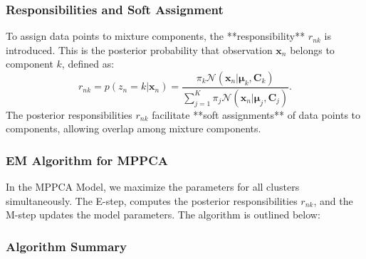 \documentclass{article}
\begin{document}
\subsubsection{Responsibilities and Soft Assignment}
To assign data points to mixture components, the **responsibility** \(r_{nk}\) is introduced. This is the posterior probability that observation \(\mathbf{x}_n\) belongs to component \(k\), defined as:
\[
r_{nk} = p(z_n = k | \mathbf{x}_n) = \frac{\pi_k \mathcal{N}(\mathbf{x}_n | \boldsymbol{\mu}_k, \mathbf{C}_k)}{\sum_{j=1}^K \pi_j \mathcal{N}(\mathbf{x}_n | \boldsymbol{\mu}_j, \mathbf{C}_j)}.
\]
The posterior responsibilities \(r_{nk}\) facilitate **soft assignments** of data points to components, allowing overlap among mixture components.

\subsubsection{EM Algorithm for MPPCA}

In the MPPCA Model, we maximize the parameters for all clusters simultaneously. The E-step, computes the posterior responsibilities \(r_{nk}\),
 and the M-step updates the model parameters. The algorithm is outlined below:

\subsubsection{Algorithm Summary}
\end{document}
